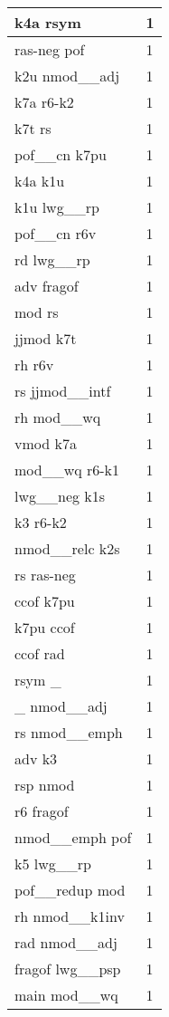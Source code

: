 \documentclass[a4 paper]{article}
\begin{document}
\begin{longtable}{p{}p{}}
k4a rsym  & 1 \\ \midrule
ras-neg pof  & 1 \\ \midrule
k2u nmod\_\_adj  & 1 \\ \midrule
k7a r6-k2  & 1 \\ \midrule
k7t rs  & 1 \\ \midrule
pof\_\_cn k7pu  & 1 \\ \midrule
k4a k1u  & 1 \\ \midrule
k1u lwg\_\_rp  & 1 \\ \midrule
pof\_\_cn r6v  & 1 \\ \midrule
rd lwg\_\_rp  & 1 \\ \midrule
adv fragof  & 1 \\ \midrule
mod rs  & 1 \\ \midrule
jjmod k7t  & 1 \\ \midrule
rh r6v  & 1 \\ \midrule
rs jjmod\_\_intf  & 1 \\ \midrule
rh mod\_\_wq  & 1 \\ \midrule
vmod k7a  & 1 \\ \midrule
mod\_\_wq r6-k1  & 1 \\ \midrule
lwg\_\_neg k1s  & 1 \\ \midrule
k3 r6-k2  & 1 \\ \midrule
nmod\_\_relc k2s  & 1 \\ \midrule
rs ras-neg  & 1 \\ \midrule
ccof k7pu  & 1 \\ \midrule
k7pu ccof  & 1 \\ \midrule
ccof rad  & 1 \\ \midrule
rsym \_  & 1 \\ \midrule
\_ nmod\_\_adj  & 1 \\ \midrule
rs nmod\_\_emph  & 1 \\ \midrule
adv k3  & 1 \\ \midrule
rsp nmod  & 1 \\ \midrule
r6 fragof  & 1 \\ \midrule
nmod\_\_emph pof  & 1 \\ \midrule
k5 lwg\_\_rp  & 1 \\ \midrule
pof\_\_redup mod  & 1 \\ \midrule
rh nmod\_\_k1inv  & 1 \\ \midrule
rad nmod\_\_adj  & 1 \\ \midrule
fragof lwg\_\_psp  & 1 \\ \midrule
main mod\_\_wq  & 1 \\ \midrule

\end{longtable}
\end{document}

